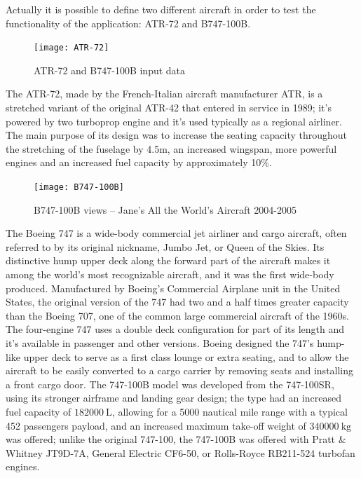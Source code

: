 \bigskip
\noindent
Actually it is possible to define two different aircraft in order to test the functionality of the application: ATR-72 and B747-100B.
%
\begin{figure}[!t]
\centering
\texttt{[image: ATR-72]}
\caption{ATR-72 and B747-100B input data}
\label{fig:Figure6}
\end{figure}

\bigskip
\noindent
The ATR-72, made by the French-Italian aircraft manufacturer ATR, is a stretched variant of the original ATR-42 that entered in service in 1989; it’s powered by two turboprop engine and it’s used typically as a regional airliner. The main purpose of its design was to increase the seating capacity throughout the stretching of the fuselage by 4.5m, an increased wingspan, more powerful engines and an increased fuel capacity by approximately 10$\%$.
%
\begin{figure}[!b]
\centering
\texttt{[image: B747-100B]}
\caption{B747-100B views – Jane's All the World's Aircraft 2004-2005}
\label{fig:Figure7}
\end{figure}

\bigskip
\noindent
The Boeing 747 is a wide-body commercial jet airliner and cargo aircraft, often referred to by its original nickname, Jumbo Jet, or Queen of the Skies. Its distinctive hump upper deck along the forward part of the aircraft makes it among the world's most recognizable aircraft, and it was the first wide-body produced. Manufactured by Boeing's Commercial Airplane unit in the United States, the original version of the 747 had two and a half times greater capacity than the Boeing 707, one of the common large commercial aircraft of the 1960s. The four-engine 747 uses a double deck configuration for part of its length and it’s available in passenger and other versions. Boeing designed the 747's hump-like upper deck to serve as a first class lounge or extra seating, and to allow the aircraft to be easily converted to a cargo carrier by removing seats and installing a front cargo door. The 747-100B model was developed from the 747-100SR, using its stronger airframe and landing gear design; the type had an increased fuel capacity of $\SI{182000}{\liter}$, allowing for a 5000 nautical mile range with a typical 452 passengers payload, and an increased maximum take-off weight of $\SI{340000}{\kilogram}$ was offered; unlike the original 747-100, the 747-100B was offered with Pratt \& Whitney JT9D-7A, General Electric CF6-50, or Rolls-Royce RB211-524 turbofan engines.

